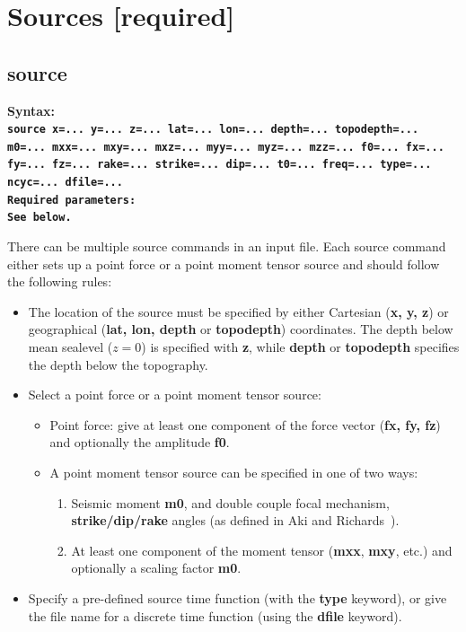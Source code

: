 \documentclass[11pt]{report}
\begin{document}
\section{Sources [required]}

\subsection{source}
\label{keyword:source}
\begin{flushleft}
\bf
Syntax:\\ \tt source
x=... y=... z=... lat=... lon=... depth=... topodepth=... m0=... mxx=... mxy=... mxz=...
myy=... myz=... mzz=... f0=... fx=... fy=... fz=... rake=... strike=... dip=... t0=... 
freq=... type=... ncyc=... dfile=...\\ 
\bf
Required parameters:\\ \rm See below.
\end{flushleft}
There can be multiple source commands in an input file. Each source command either sets up a point
force or a point moment tensor source and should follow the following rules:
\begin{itemize}
\item The location of the source must be specified by either Cartesian ({\bf x, y, z}) or
  geographical ({\bf lat, lon, depth} or {\bf topodepth}) coordinates. The depth below mean sealevel
  ($z=0$) is specified with {\bf z}, while {\bf depth} or {\bf topodepth} specifies the depth below the
  topography.
\item Select a point force or a point moment tensor source:
  \begin{itemize}
  \item Point force: give at least one component of the force vector ({\bf fx, fy, fz}) and
    optionally the amplitude {\bf f0}.
  \item A point moment tensor source can be specified in one of two ways:
    \begin{enumerate}
    \item Seismic moment {\bf m0}, and double couple focal mechanism, {\bf strike/dip/rake} angles
      (as defined in Aki and Richards~\cite{Aki-Richards-02}). 
    \item At least one component of the moment tensor ({\bf mxx}, {\bf mxy}, etc.) and optionally a
      scaling factor {\bf m0}. 
    \end{enumerate}
  \end{itemize}
\item Specify a pre-defined source time function (with the {\bf type} keyword), or give the file
  name for a discrete time function (using the {\bf dfile} keyword).
\end{itemize}
\end{document}

